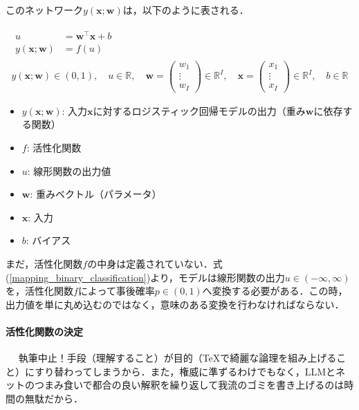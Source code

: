 \documentclass[a4paper,dvipdfmx]{jarticle}
\begin{document}
このネットワーク$y(\bm{x}; \bm{w})$は，以下のように表される．

\begin{gather}
  \begin{aligned}
    u &= \bm{w}^\top \bm{x} + b \\
    y(\bm{x}; \bm{w}) &= f(u)
  \end{aligned} \nonumber \\
  y(\bm{x}; \bm{w}) \in (0, 1),\quad
  u \in \mathbb{R},\quad
  \bm{w} = \begin{pmatrix}
    w_1 \\
    \vdots \\
    w_I
  \end{pmatrix} \in \mathbb{R}^I,\quad
  \bm{x} = \begin{pmatrix}
    x_1 \\
    \vdots \\
    x_I
  \end{pmatrix} \in \mathbb{R}^I,\quad
  b \in \mathbb{R} \nonumber
\end{gather}

\begin{itemize}
  \item $y(\bm{x}; \bm{w})$: 入力$\bm{x}$に対するロジスティック回帰モデルの出力（重み$\bm{w}$に依存する関数）
  \item $f$: 活性化関数
  \item $u$: 線形関数の出力値
  \item $\bm{w}$: 重みベクトル（パラメータ）
  \item $\bm{x}$: 入力
  \item $b$: バイアス
\end{itemize}

まだ，活性化関数$f$の中身は定義されていない．式(\ref{mapping_binary_classification})より，モデルは線形関数の出力$u \in (-\infty, \infty)$を，活性化関数$f$によって事後確率$p \in (0, 1)$へ変換する必要がある．この時，出力値を単に丸め込むのではなく，意味のある変換を行わなければならない．

\paragraph{活性化関数の決定}　
執筆中止！手段（理解すること）が目的（TeXで綺麗な論理を組み上げること）にすり替わってしまうから．また，権威に準ずるわけでもなく，LLMとネットのつまみ食いで都合の良い解釈を繰り返して我流のゴミを書き上げるのは時間の無駄だから．
\end{document}
